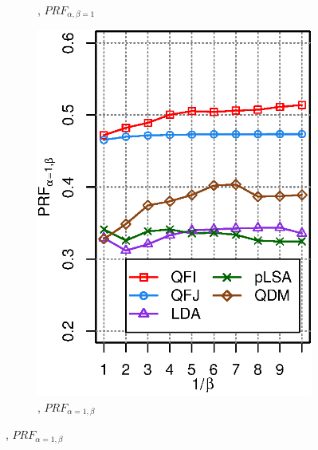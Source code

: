 \begin{figure}[H]
\begin{subfigure}[b]{0.45\columnwidth}
\caption{\DQF, $P\!R\!F_{\alpha,\beta=1}$}
\end{subfigure}
\begin{subfigure}[b]{0.45\columnwidth}
\includegraphics[width=\columnwidth]{figure/qf13-prfaf-5models.eps}
\caption{\DQF, $P\!R\!F_{\alpha=1,\beta}$}
\end{subfigure}
\end{figure}

